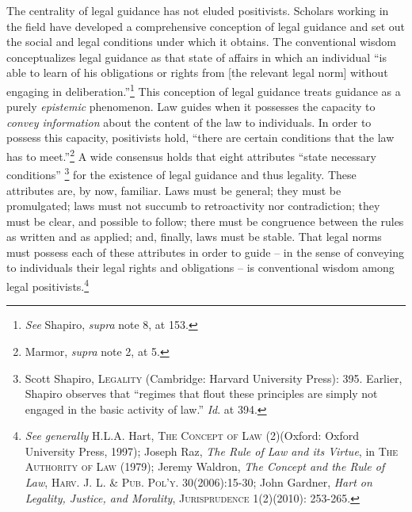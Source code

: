 The centrality of legal guidance has not eluded positivists. Scholars
working in the field have developed a comprehensive conception of legal
guidance and set out the social and legal conditions under which it
obtains. The conventional wisdom conceptualizes legal guidance as that
state of affairs in which an individual ``is able to learn of his
obligations or rights from {[}the relevant legal norm{]} without
engaging in deliberation.''\footnote{\emph{See} Shapiro, \emph{supra}
  note 8, at 153.} This conception of legal guidance treats guidance as
a purely \emph{epistemic} phenomenon. Law guides when it possesses the
capacity to \emph{convey information} about the content of the law to
individuals. In order to possess this capacity, positivists hold,
``there are certain conditions that the law has to meet.''\footnote{Marmor,
  \emph{supra} note 2, at 5.} A wide consensus holds that eight
attributes ``state necessary conditions'' \footnote{Scott Shapiro,
  \textsc{Legality} (Cambridge: Harvard University Press): 395. Earlier,
  Shapiro observes that ``regimes that flout these principles are simply
  not engaged in the basic activity of law.'' \emph{Id}. at 394.} for
the existence of legal guidance and thus legality. These attributes are,
by now, familiar. Laws must be general; they must be promulgated; laws
must not succumb to retroactivity nor contradiction; they must be clear,
and possible to follow; there must be congruence between the rules as
written and as applied; and, finally, laws must be stable. That legal
norms must possess each of these attributes in order to guide -- in the
sense of conveying to individuals their legal rights and obligations --
is conventional wisdom among legal positivists.\footnote{\emph{See
  generally} H.L.A. Hart, \textsc{The Concept of Law} (2)(Oxford: Oxford
  University Press, 1997); Joseph Raz, \emph{The Rule of Law and its
  Virtue}, in \textsc{The Authority of Law} (1979); Jeremy Waldron,
  \emph{The Concept and the Rule of Law}, \textsc{Harv. J. L. \& Pub.
  Pol'y.} 30(2006):15-30; John Gardner, \emph{Hart on Legality, Justice,
  and Morality}, \textsc{Jurisprudence} 1(2)(2010): 253-265.}

